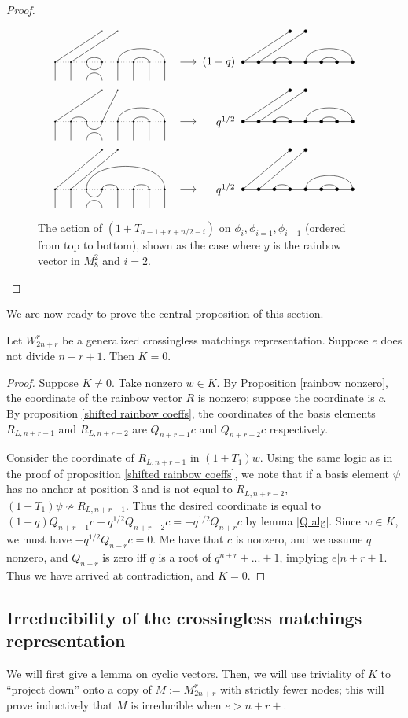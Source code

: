 \documentclass{amsart}
\begin{document}
\begin{proof}
	
	\begin{figure}
		\[
		\GeneralizedAction{8}{3/4,5/8,6/7}{2}{1/1,2/2}{1}{3}{3/4,5/8,6/7}{1/1,2/2}{(1+q)}
		\]
		\[
		\GeneralizedAction{8}{2/3,5/8,6/7}{2}{1/1,4/2}{1}{3}{3/4,5/8,6/7}{1/1,2/2}{q^{1/2}}
		\]
		\[
		\GeneralizedAction{8}{3/8,4/5,6/7}{2}{1/1,2/2}{1.25}{3}{3/4,5/8,6/7}{1/1,2/2}{q^{1/2}}
		\]
		\caption{The action of $(1+T_{a-1+r+n/2-i})$ on $\phi_i,\phi_{i=1},\phi_{i+1}$ (ordered from top to bottom), shown as the case where $y$ is the rainbow vector in $M_{8}^2$ and $i=2$.}
		\label{shifted relations}
	\end{figure}
\end{proof}	

We are now ready to prove the central proposition of this section.


\begin{proposition}
	Let $W_{2n+r}^r$ be a generalized crossingless matchings representation. Suppose $e$ does not divide $n+r+1$. Then $K=0$.
	
	\label{trivial kernel}
\end{proposition}

\begin{proof}
	Suppose $K\not=0$. Take nonzero $w\in K$. By Proposition \ref{rainbow nonzero}, the coordinate of the rainbow vector $R$ is nonzero; suppose the coordinate is $c$. By proposition \ref{shifted rainbow coeffs}, the coordinates of the basis elements $R_{L,n+r-1}$ and $R_{L,n+r-2}$ are $Q_{n+r-1}c$ and $Q_{n+r-2}c$ respectively.
	
	Consider the coordinate of $R_{L,n+r-1}$ in $(1+T_1)w$. Using the same logic as in the proof of proposition \ref{shifted rainbow coeffs}, we note that if a basis element $\psi$ has no anchor at position $3$ and is not equal to $R_{L,n+r-2}$, $(1+T_1)\psi\not\sim R_{L,n+r-1}$. Thus the desired coordinate is equal to $(1+q)Q_{n+r-1}c+q^{1/2}Q_{n+r-2}c=-q^{1/2}Q_{n+r}c$ by lemma \ref{Q alg}. Since $w\in K$, we must have $-q^{1/2}Q_{n+r}c=0$. Me have that $c$ is nonzero, and we assume $q$ nonzero, and $Q_{n+r}$ is zero iff $q$ is a root of $q^{n+r}+...+1$, implying $e|n+r+1$. Thus we have arrived at contradiction, and $K=0$.
\end{proof}

\subsection{Irreducibility of the crossingless matchings representation}
We will first give a lemma on cyclic vectors.
Then, we will use triviality of $K$ to ``project down'' onto a copy of $M := M_{2n + r}^r$ with strictly fewer nodes;
this will prove inductively that $M$ is irreducible when $e > n + r + $.
\end{document}
